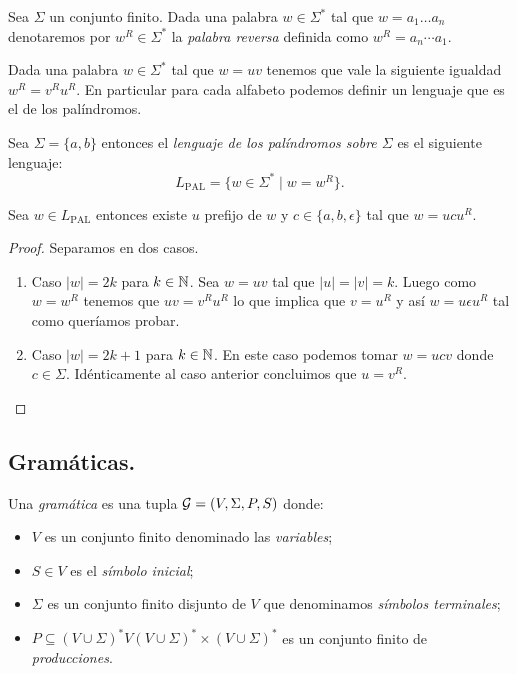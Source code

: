 \documentclass[tesis.tex]{subfiles}
\begin{document}
\begin{deff}\label{deff_pal_reversa}
	Sea $\Sigma$ un conjunto finito.
	Dada una palabra $w \in \Sigma^*$ tal que $w = a_1 \dots a_n$ denotaremos por $w^R \in \Sigma^*$ la \emph{palabra reversa} definida como $w^R = a_{n} \cdots a_{1}$.
\end{deff}

Dada una palabra $w \in \Sigma^*$ tal que $w = uv$ tenemos que vale la siguiente igualdad $w^R = v^Ru^R$.
En particular para cada alfabeto podemos definir un lenguaje que es el de los palíndromos.

\begin{deff}
	Sea $\Sigma = \{a,b\}$ entonces el \emph{lenguaje de los palíndromos sobre $\Sigma$} es el siguiente lenguaje:
	\[
		L_{\text{PAL}} = \{  w \in \Sigma^* \mid w = w^R \}.
	\]
\end{deff}



\begin{lema}\label{lema_palindromos_forma}
	Sea $w \in L_{\text{PAL}}$ entonces existe $u$ prefijo de $w$ y $c \in \{ a, b, \epsilon\}$ tal que $w = ucu^R$.
\end{lema}
\begin{proof}
	Separamos en dos casos.
	\begin{enumerate}
		\item Caso $|w| = 2k$ para $k \in \mathbb{N}$.
		Sea $w = uv$ tal que $|u| = |v| = k$. 
		Luego como $w = w^R$ tenemos que $uv = v^Ru^R$ lo que implica que $v = u^R$ y así $w = u \epsilon u^R$ tal como queríamos probar.
		
		\item Caso $|w| = 2k+1$ para $k \in \mathbb{N}$.
		En este caso podemos tomar $w = ucv$ donde $c \in \Sigma$.
		Idénticamente al caso anterior concluimos que $u = v^R$.
	\end{enumerate}
\end{proof}


\subsection{Gramáticas.}

\begin{deff}
	Una \emph{gramática} es una tupla ${\cal G} = (V, \Sigma, P, S)$ donde:
	\begin{itemize}
		\item $V$ es un conjunto finito denominado las \emph{variables};
		\item $S \in V$ es el \emph{símbolo inicial};
		\item $\Sigma$ es un conjunto finito disjunto de $V$ que denominamos \emph{símbolos terminales};
		\item $P \subseteq (V \cup \Sigma)^*V(V \cup \Sigma)^* \times (V \cup \Sigma)^*$ es un conjunto finito de \emph{producciones}.
	\end{itemize}
\end{deff}
\end{document}

